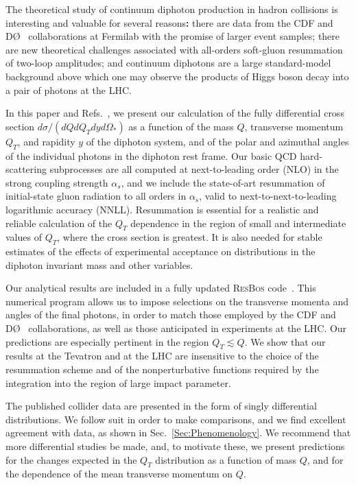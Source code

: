 \documentclass[12pt,english,aps,preprint,prd,letterpaper,fleqn,nofootinbib,showpacs,showkeys,tightenlines,floatfix]{revtex4}
\begin{document}
{The theoretical study of continuum diphoton production in hadron collisions is 
interesting and valuable for several reasons{\bf:}   
there are data from the CDF and D\O~ collaborations at Fermilab 
with the promise of larger event samples; there are new 
theoretical challenges associated with all-orders soft-gluon 
resummation of two-loop amplitudes; and continuum diphotons are 
a large standard-model background above which one may observe 
the products of Higgs boson decay into a pair of photons at the 
LHC.  

In this paper and Refs.~\cite{Balazs:2006cc,Nadolsky:2007ba}, we present our calculation of the fully differential cross 
section $d\sigma/(dQdQ_{T}dyd\Omega_{*})$ as a function of the 
mass $Q$, transverse momentum $Q_T$, and rapidity $y$ of the diphoton 
system, and of the polar and azimuthal angles of the individual photons 
in the diphoton rest frame.  Our basic QCD hard-scattering subprocesses 
are all computed at next-to-leading order (NLO) in the strong coupling strength 
$\alpha_s$, and we include the state-of-art resummation of initial-state gluon radiation 
to all orders in $\alpha_s$, valid to next-to-next-to-leading logarithmic 
accuracy (NNLL). Resummation is essential for a realistic and reliable 
calculation of the $Q_T$ dependence in the region of small and intermediate 
values of $Q_T$, where the cross section is greatest.  It is also needed 
for stable estimates of the effects of experimental acceptance on distributions 
in the diphoton invariant mass and other variables.

Our analytical results are included in  a fully updated \textsc{ResBos} 
code~\cite{Balazs:1997xd,Balazs:1999gh}. 
This numerical program allows us to impose selections on the transverse 
momenta and angles of the final photons, in order to match those employed 
by the CDF and D\O~ collaborations, as well as those anticipated in experiments at the LHC.  Our predictions are especially 
pertinent in the region $Q_{T}\lesssim Q$.  We show that our results at 
the Tevatron and at the LHC are insensitive to the choice of the resummation 
scheme and of the nonperturbative functions required by the integration 
into the region of large impact parameter.  

The published collider data are presented in the form of singly
differential distributions.  We follow suit in order to make comparisons, and we 
find excellent agreement with data, as shown in Sec.~\ref{Sec:Phenomenology}.  
We recommend that more differential studies be
made, and, to motivate these, we present predictions for the changes expected 
in the $Q_T$ distribution as a function of mass $Q$, and for the dependence of 
the mean transverse momentum on $Q$.  

}
\end{document}
